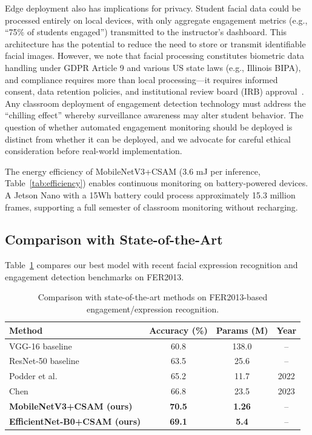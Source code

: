 \documentclass[apajournal,article,submit,pdftex,moreauthors]{Definitions/mdpi}
\begin{document}
Edge deployment also has implications for privacy. Student facial data could be processed entirely on local devices, with only aggregate engagement metrics (e.g., ``75\% of students engaged'') transmitted to the instructor's dashboard. This architecture has the potential to reduce the need to store or transmit identifiable facial images. However, we note that facial processing constitutes biometric data handling under GDPR Article 9 and various US state laws (e.g., Illinois BIPA), and compliance requires more than local processing---it requires informed consent, data retention policies, and institutional review board (IRB) approval~\citep{williamson2020surveillance}. Any classroom deployment of engagement detection technology must address the ``chilling effect'' whereby surveillance awareness may alter student behavior. The question of whether automated engagement monitoring should be deployed is distinct from whether it can be deployed, and we advocate for careful ethical consideration before real-world implementation.

The energy efficiency of MobileNetV3+CSAM (3.6 mJ per inference, Table~\ref{tab:efficiency}) enables continuous monitoring on battery-powered devices. A Jetson Nano with a 15Wh battery could process approximately 15.3 million frames, supporting a full semester of classroom monitoring without recharging.

\subsection{Comparison with State-of-the-Art}

Table~\ref{tab:sota} compares our best model with recent facial expression recognition and engagement detection benchmarks on FER2013.

\begin{table}[H]
\caption{Comparison with state-of-the-art methods on FER2013-based engagement/expression recognition.}
\label{tab:sota}
\begin{tabular}{lccc}
\toprule
\textbf{Method} & \textbf{Accuracy (\%)} & \textbf{Params (M)} & \textbf{Year} \\
\midrule
VGG-16 baseline & 60.8 & 138.0 & -- \\
ResNet-50 baseline & 63.5 & 25.6 & -- \\
Podder et al.~\citep{podder2022time} & 65.2 & 11.7 & 2022 \\
Chen~\citep{chen2023resnet} & 66.8 & 23.5 & 2023 \\
\midrule
\textbf{MobileNetV3+CSAM (ours)} & \textbf{70.5} & \textbf{1.26} & -- \\
\textbf{EfficientNet-B0+CSAM (ours)} & \textbf{69.1} & \textbf{5.4} & -- \\
\bottomrule
\end{tabular}
\end{table}
\end{document}
